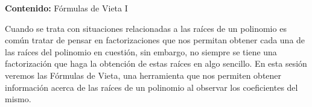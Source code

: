{\Large\textbf{Contenido:} Fórmulas de Vieta I}

Cuando se trata con situaciones relacionadas a las raíces de un polinomio es común tratar de pensar en factorizaciones
que nos permitan obtener cada una de las raíces del polinomio en cuestión, sin embargo, no siempre se tiene una factorización que haga la obtención de estas raíces en algo sencillo.
En esta sesión veremos las Fórmulas de Vieta, una herramienta que nos permiten obtener información acerca de las raíces de un polinomio al observar los coeficientes del mismo.